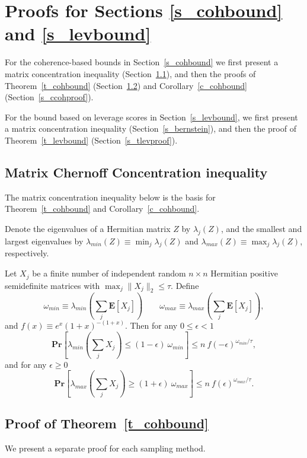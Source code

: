 \documentclass{siamltex}
\begin{document}
 
\appendix  

\section{Proofs for 
Sections \ref{s_cohbound} and \ref{s_levbound}}\label{s_app}
For the coherence-based bounds in Section~\ref{s_cohbound} we first
present a matrix concentration inequality (Section~\ref{s_chernoff}), 
and then the proofs of
Theorem~\ref{t_cohbound} (Section~\ref{s_tcohproof})
and Corollary~\ref{c_cohbound} (Section~\ref{s_ccohproof}).

For the bound based on leverage scores in Section~\ref{s_levbound},
we first present a matrix concentration inequality
(Section~\ref{s_bernstein}), and then the proof of
Theorem~\ref{t_levbound} (Section~\ref{s_tlevproof}).
\subsection{Matrix Chernoff Concentration inequality}\label{s_chernoff}
The matrix concentration inequality below is the basis for
Theorem~\ref{t_cohbound} and Corollary~\ref{c_cohbound}.

Denote the eigenvalues of a Hermitian matrix $Z$ by $\lambda_j(Z)$,
and the smallest and largest eigenvalues by
$\lambda_{min}(Z)\equiv \min_j{\lambda_j(Z)}$ and
$\lambda_{max}(Z) \equiv \max_j{\lambda_j(Z)}$, respectively.

\begin{theorem}\label{t_tropp}
Let $X_j$ be a finite number of independent random $n\times n$
Hermitian positive semidefinite matrices with 
$\max_j{\|X_j\|_2}\leq \tau$.
Define 
$$\omega_{min}\equiv\lambda_{min}\left(\sum_j{{\mathbf{E}}[X_j]}\right) \qquad
\omega_{max}\equiv\lambda_{max}\left(\sum_j{{\mathbf{E}}[X_j]}\right),$$
and $f(x)\equiv e^x(1+x)^{-(1+x)}$.
Then for any $0\leq \epsilon< 1$
$${\mathbf{Pr}}\left[\lambda_{min}\left(\sum_j{X_j}\right) 
\leq (1-\epsilon) \>\omega_{min} \right]\leq n 
\> f(-\epsilon)^{\omega_{min}/\tau},$$
and for any $\epsilon\geq 0$
$${\mathbf{Pr}}\left[\lambda_{max}\left(\sum_j{X_j}\right) 
\geq (1+\epsilon) \>\omega_{max} \right]\leq n  \> 
f(\epsilon)^{\omega_{max}/\tau}.$$
\end{theorem}

\subsection{Proof of Theorem~\ref{t_cohbound}}\label{s_tcohproof}
We present a separate proof for each sampling method.
\end{document}
